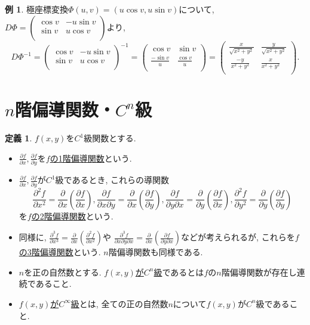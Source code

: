 \documentclass[dvipdfmx,a4paper,11pt]{article}
\theoremstyle{definition}
\newtheorem{dfn}[thm]{定義}
\newtheorem{exa}[thm]{例}
\newcommand{\pdrv}[2]{\frac{\partial #1}{\partial #2}}
\newcommand{\ppdrv}[3]{\frac{\partial #1}{\partial #2 \partial #3}}
\begin{document}
\begin{exa}

     極座標変換$\Phi(u,v)  = (u \cos v, u \sin v)$について,
$D\Phi = \left(\begin{array}{cc} \cos v& -u\sin v\\ \sin v& u \cos v\\ \end{array} \right)$より, 
$$D\Phi^{-1} = \left(\begin{array}{cc} \cos v& -u\sin v\\ \sin v& u \cos v\\ \end{array} \right)^{-1}
= \left(\begin{array}{cc} \cos v& \sin v\\ \frac{-\sin v}{u}& \frac{\cos v}{u}\\ \end{array} \right)
= \left(\begin{array}{cc} \frac{x}{\sqrt{x^2+y^2}}& \frac{y}{\sqrt{x^2+y^2}}\\\ \frac{-y}{x^2+y^2}& \frac{x}{x^2+y^2}\\ \end{array} \right).
$$
    
    \end{exa}
    
\section{$n$階偏導関数・$C^n$級}

\begin{tcolorbox}[
    colback = white,
    colframe = green!35!black,
    fonttitle = \bfseries,
    breakable = true]
    \begin{dfn}
$f(x,y)$を$C^1$級関数とする.
\begin{itemize}
\item $\pdrv{f}{x} , \pdrv{f}{y}$を\underline{$f$の1階偏導関数}という.
\item $\pdrv{f}{x} , \pdrv{f}{y}$が$C^1$級であるとき, これらの導関数
$$
\pdrv{^2f}{x^2} = \pdrv{}{x}\left( \pdrv{f}{x} \right), 
\ppdrv{f}{x}{y} =\pdrv{}{x}\left( \pdrv{f}{y} \right), 
\ppdrv{f}{y}{x} =\pdrv{}{y}\left( \pdrv{f}{x} \right), 
\pdrv{^2f}{y^2} = \pdrv{}{y}\left( \pdrv{f}{y} \right)
$$
を\underline{$f$の2階偏導関数}という.
\item 同様に, $\pdrv{^3f}{x^3} = \pdrv{}{x}\left( \pdrv{^2f}{x^2} \right)$や
$\frac{\partial^3 f}{\partial x \partial y \partial x} = \pdrv{}{x}\left( \ppdrv{f}{y}{x}\right)$などが考えられるが, これらを\underline{$f$の3階偏導関数}という.
$n$階偏導関数も同様である.

\item $n$を正の自然数とする.
\underline{$f(x,y)$が$C^n$級}であるとは$f$の$n$階偏導関数が存在し連続であること.
\item \underline{$f(x,y)$が$C^{\infty}$級}とは, 全ての正の自然数$n$について$f(x,y)$が$C^n$級であること.

\end{itemize}

    \end{dfn}
    \end{tcolorbox}
\end{document}
